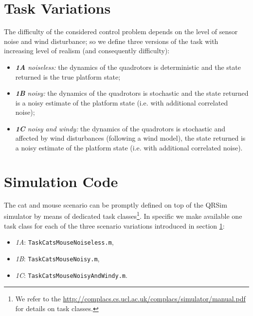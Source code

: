 \documentclass[a4paper,11pt]{report}
\newcommand{\sname}{QRSim\xspace}
\newcommand{\webman}{\url{http://complacs.cs.ucl.ac.uk/complacs/simulator/manual.pdf}\xspace}
\newcommand\mytexttt[1]{\texttt{\hyphenchar\font=45\relax #1}}
\begin{document}
\section{Task Variations} \label{CatMouseVariations}
The difficulty of the considered control problem depends on the level of sensor noise and wind disturbance; so we define three versions of the task with increasing level of realism (and consequently difficulty):
\begin{itemize}
 \item \textit{\textbf{1A} noiseless:} the dynamics of the quadrotors is deterministic and the state returned is the true platform state;
 \item \textit{\textbf{1B} noisy:} the dynamics of the quadrotors is stochastic and the state returned is a noisy estimate of the platform state (i.e. with additional correlated noise);
 \item \textit{\textbf{1C} noisy and windy:} the dynamics of the quadrotors is stochastic and affected by wind disturbances (following a wind model), the state returned is a noisy estimate of the platform state (i.e. with additional correlated noise).
\end{itemize}


\section{Simulation Code}\label{CatMouseSim}
The cat and mouse scenario can be promptly defined on top of the \sname simulator by means of dedicated task classes\footnote{We refer to the \webman for details on task classes.}. In specific we make available one task class for each of the three scenario variations introduced in section \ref{CatMouseVariations}:
\begin{itemize}
\item\textit{1A}: \mytexttt{TaskCatsMouseNoiseless.m},
\item\textit{1B}: \mytexttt{TaskCatsMouseNoisy.m},
\item\textit{1C}: \mytexttt{TaskCatsMouseNoisyAndWindy.m}. 
\end{itemize}
\end{document}
